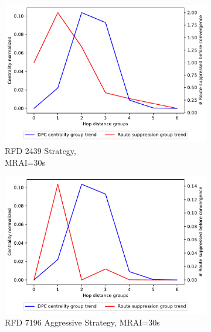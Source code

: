 \begin{figure}[H]
\begin{subfigure}[b]{0.325\textwidth}
         \centering
         \includegraphics[width=\textwidth]{images/RFD/miceVSelephants/MultiMRAI/30/mice/cisco_1000_RFD_nodeConvergence_centVSsup_trend.pdf}
         \caption{RFD 2439 Strategy, \\MRAI=30s}
         \label{fig:1000_2439RFD_centVSsup_mices}
     \end{subfigure}
     \hfill
     \begin{subfigure}[b]{0.325\textwidth}
         \centering
         \includegraphics[width=\textwidth]{images/RFD/miceVSelephants/MultiMRAI/30/mice/cisco_1000_RFD_7196_aggressive_nodeConvergence_centVSsup_trend.pdf}
         \caption{RFD 7196 Aggressive Strategy, MRAI=30s}
         \label{fig:1000_7196RFDA_centVSsup_mices}
     \end{subfigure}
     \hfill
     \begin{subfigure}[b]{0.325\textwidth}

\end{subfigure}
\end{figure}
